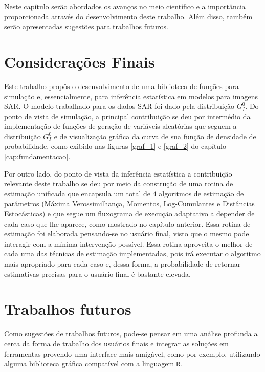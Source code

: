 
Neste capítulo serão abordados os avanços no meio científico e a importância proporcionada através do desenvolvimento deste trabalho. Além disso, também serão apresentadas sugestões para trabalhos futuros.

\section{Considerações Finais}

Este trabalho propôs o desenvolvimento de uma biblioteca de funções para simulação e, essencialmente, para inferência estatística em modelos para imagens SAR. O modelo trabalhado para os dados SAR foi dado pela distribuição $G_I^0$. Do ponto de vista de simulação, a principal contribuição se deu por intermédio da implementação de funções de geração de variáveis aleatórias que seguem a distribuição $G_I^0$ e de visualização gráfica da curva de sua função de densidade de probabilidade, como exibido nas figuras \ref{graf_1} e \ref{graf_2} do capítulo \ref{cap:fundamentacao}.

Por outro lado, do ponto de vista da inferência estatística a contribuição relevante deste trabalho se deu por meio da construção de uma rotina de estimação unificada que encapsula um total de $4$ algoritmos de estimação de parâmetros (Máxima Verossimilhança, Momentos, Log-Cumulantes e Distâncias Estocásticas) e que segue um fluxograma de execução adaptativo a depender de cada caso que lhe aparece, como mostrado no capítulo anterior. Essa rotina de estimação foi elaborada pensando-se no usuário final, visto que o mesmo pode interagir com a mínima intervenção possível. Essa rotina aproveita o melhor de cada uma das técnicas de estimação implementadas, pois irá executar o algoritmo mais apropriado para cada caso e, dessa forma, a probabilidade de retornar estimativas precisas para o usuário final é bastante elevada.

\section{Trabalhos futuros}

Como sugestões de trabalhos futuros, pode-se pensar em uma análise profunda a cerca da forma de trabalho dos usuários finais e integrar as soluções em ferramentas provendo uma interface mais amigável, como por exemplo, utilizando alguma biblioteca gráfica compatível com a linguagem \texttt{R}.

